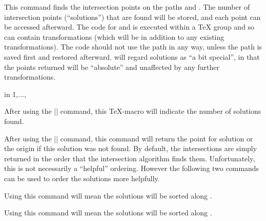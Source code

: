 \begin{command}{\pgfintersectionofpaths{}}
    This command finds the intersection points on the paths  and
    . The number of intersection points (``solutions'') that are
    found will be stored, and each point can be accessed afterward. The code
    for  and  is executed within a \TeX{} group and
    so can contain transformations (which will be in addition to any existing
    transformations). The code should not use the path in any way, unless the
    path is saved first and restored afterward. \pgfname{} will regard
    solutions as ``a bit special'', in that the points returned  will be
    ``absolute'' and unaffected by any further transformations.
\begin{codeexample}[preamble={\usetikzlibrary{intersections}}]
\begin{pgfpicture}
\pgfintersectionofpaths
{
  \pgfgetpath\temppath
  \pgfsetpath\temppath
}
{
  \pgfgetpath\temppath
  \pgfsetpath\temppath
}
\foreach \s in {1,...,\pgfintersectionsolutions}
  {\pgfpathcircle{\pgfpointintersectionsolution{\s}}{2pt}}
\end{pgfpicture}
\end{codeexample}

    \begin{command}{\pgfintersectionsolutions}
        After using the |\pgfintersectionofpaths| command, this \TeX-macro will
        indicate the number of solutions found.
    \end{command}

    \begin{command}{\pgfpointintersectionsolution{}}
        After using the |\pgfintersectionofpaths| command, this command will
        return the point for solution  or the origin if this
        solution was not found. By default, the intersections are simply
        returned in the order that the intersection algorithm finds them.
        Unfortunately, this is not necessarily a ``helpful'' ordering. However
        the following two commands can be used to order the solutions more
        helpfully.
    \end{command}

        \let\ifpgfintersectionsortbyfirstpath=\relax
    \begin{command}{\pgfintersectionsortbyfirstpath}
        Using this command will mean the solutions will be sorted along
        .
    \end{command}

        \let\ifpgfintersectionsortbysecondpath=\relax
    \begin{command}{\pgfintersectionsortbysecondpath}
        Using this command will mean the solutions will be sorted along
        .
    \end{command}
\end{command}


